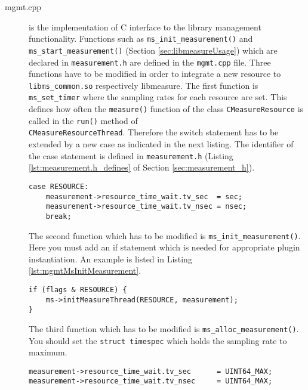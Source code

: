 \begin{description}
\item[mgmt.cpp] is the implementation of C interface to the library management functionality. Functions such as \texttt{ms\_init\_measurement()} and\\ \texttt{ms\_start\_measurement()} (Section \ref{sec:libmeasureUsage}) which are declared in \texttt{measurement.h} are defined in the \texttt{mgmt.cpp} file. Three functions have to be modified in order to integrate a new resource to \texttt{libms\_common.so} respectively libmeasure. The first function is \texttt{ms\_set\_timer} where the sampling rates for each resource are set. This defines how often the \texttt{measure()} function of the class \texttt{CMeasureResource} is called in the \texttt{run()} method of \\\texttt{CMeasureResourceThread}. Therefore the switch statement has to be extended by a new case as indicated in the next listing. The identifier of the case statement is defined in \texttt{measurement.h} (Listing \ref{lst:measurement.h_defines} of Section \ref{sec:measurement_h}).
\begin{lstlisting}[caption={Code to store resource-specific sampling rates in the \texttt{ms\_set\_timer()} function.}, label=lst:mgmt]
case RESOURCE:
	measurement->resource_time_wait.tv_sec	= sec;
	measurement->resource_time_wait.tv_nsec	= nsec;
	break;
\end{lstlisting}
The second function which has to be modified is \texttt{ms\_init\_measurement()}. Here you must add an if statement which is needed for appropriate plugin instantiation. An example is listed in Listing \ref{lst:mgmtMsInitMeasurement}.
\begin{lstlisting}[caption={Extension of the \texttt{ms\_init\_measurement()} function.}, label=lst:mgmtMsInitMeasurement]
if (flags & RESOURCE) {
	ms->initMeasureThread(RESOURCE, measurement);
}
\end{lstlisting}

\pagebreak

The third function which has to be modified is \texttt{ms\_alloc\_measurement()}. You should set the \texttt{struct timespec} which holds the sampling rate to maximum.
\begin{lstlisting}[caption={Extension of the \texttt{ms\_alloc\_measurement()} function.}, label=lst:AlloctoMaxInteger]
measurement->resource_time_wait.tv_sec		= UINT64_MAX;
measurement->resource_time_wait.tv_nsec		= UINT64_MAX;
\end{lstlisting}
\end{description}

